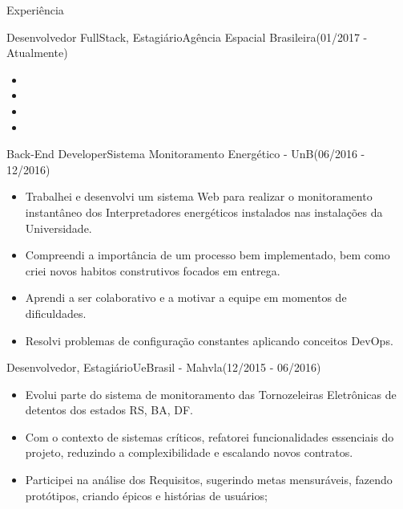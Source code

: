\documentclass[]{fraguilarcv}
\begin{document}
	\makeheader

	\begin{cvsection}{Experiência}
		\begin{cvsubsection}{Desenvolvedor FullStack, Estagiário}{Agência Espacial Brasileira}{(01/2017 - Atualmente)}
			\begin{itemize}
				\item
	      \item
				\item
	      \item
			\end{itemize}
		\end{cvsubsection}

		\begin{cvsubsection}{Back-End Developer}{Sistema Monitoramento Energético - UnB}{(06/2016 - 12/2016)}
			\begin{itemize}
	      \item Trabalhei e desenvolvi um sistema Web para realizar o monitoramento instantâneo dos Interpretadores energéticos instalados nas instalações da Universidade.
	      \item Compreendi a importância de um processo bem implementado, bem como criei novos habitos construtivos focados em entrega.
	      \item Aprendi a ser colaborativo e a motivar a equipe em momentos de dificuldades.
	      \item Resolvi problemas de configuração constantes aplicando conceitos DevOps.
			\end{itemize}
		\end{cvsubsection}

		\begin{cvsubsection}{Desenvolvedor, Estagiário}{UeBrasil - Mahvla}{(12/2015 - 06/2016)}
			\begin{itemize}
				\item Evolui parte do sistema de monitoramento das Tornozeleiras Eletrônicas de detentos dos estados RS, BA, DF.
	      \item Com o contexto de sistemas críticos, refatorei funcionalidades essenciais do projeto, reduzindo a complexibilidade e escalando novos contratos.
	      \item Participei na análise dos Requisitos, sugerindo metas mensuráveis, fazendo protótipos, criando épicos e histórias de usuários;
			\end{itemize}
		\end{cvsubsection}


\end{cvsection}
\end{document}
